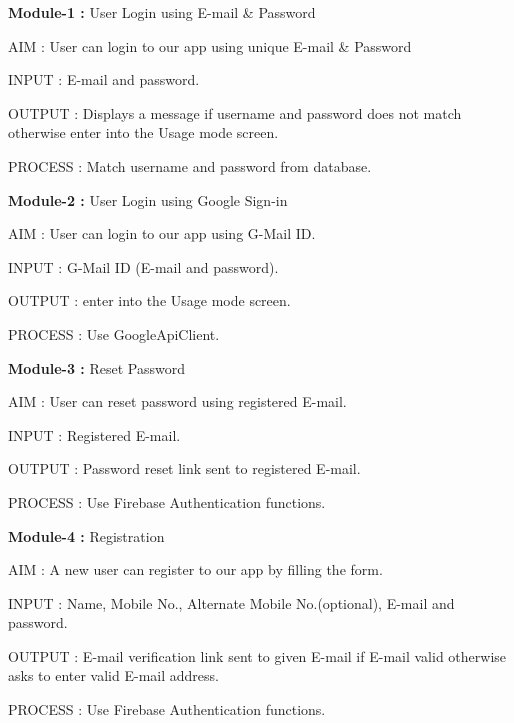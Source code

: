 \documentclass{report}
\begin{document}
\noindent \newline
\textbf{Module-1 :} User Login using E-mail \& Password
\begin{description}
\item AIM : User can login to our app using unique E-mail \& Password
\item INPUT : E-mail and password.    
\item OUTPUT :  Displays a message if username and password does not match otherwise enter into the Usage mode screen.
\item PROCESS : Match username and password from database.
\end{description}

\noindent \newline \textbf{Module-2 :} User Login using Google Sign-in\cite{c15}
\begin{description}
\item AIM : User can login to our app using G-Mail ID.
\item INPUT : G-Mail ID (E-mail and password).
\item OUTPUT : enter into the Usage mode screen.
\item PROCESS : Use GoogleApiClient.
\end{description}

\noindent \newline \textbf{Module-3 :} Reset Password
\begin{description}
\item AIM : User can reset password using registered E-mail.
\item INPUT : Registered E-mail.
\item OUTPUT : Password reset link sent to registered E-mail.
\item PROCESS : Use Firebase Authentication functions.
\end{description}

\noindent \newline \textbf{Module-4 :} Registration
\begin{description}
\item AIM : A new user can register to our app by filling the form.
\item INPUT : Name, Mobile No., Alternate Mobile No.(optional), E-mail and password.
\item OUTPUT : E-mail verification link sent to given E-mail if E-mail valid otherwise asks to enter valid E-mail address.
\item PROCESS : Use Firebase Authentication functions.
\end{description}
\end{document}
